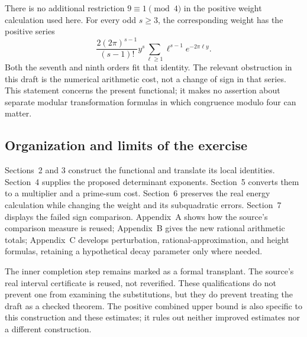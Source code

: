 There is no additional restriction $9\equiv1\pmod4$ in the positive
weight calculation used here. For every odd $s\geq3$, the corresponding
weight has the positive series
\[
 \frac{2(2\pi)^{s-1}}{(s-1)!}y^s
       \sum_{\ell\geq1}\ell^{s-1}e^{-2\pi\ell y}.
\]
Both the seventh and ninth orders fit that identity. The relevant
obstruction in this draft is the numerical arithmetic cost, not a
change of sign in that series. This statement concerns the present
functional; it makes no assertion about separate modular transformation
formulas in which congruence modulo four can matter.

\subsection{Organization and limits of the exercise}

Sections~2 and 3 construct the functional and translate its local
identities. Section~4 supplies the proposed determinant exponents.
Section~5 converts them to a multiplier and a prime-sum cost.
Section~6 preserves the real energy calculation while changing the
weight and its subquadratic errors. Section~7 displays the failed sign
comparison. Appendix~A shows how the source's comparison measure is
reused; Appendix~B gives the new rational arithmetic totals;
Appendix~C develops perturbation, rational-approximation, and height
formulas, retaining a hypothetical decay parameter only where needed.

The inner completion step remains marked as a formal transplant. The
source's real interval certificate is reused, not reverified. These
qualifications do not prevent one from examining the substitutions,
but they do prevent treating the draft as a checked theorem. The
positive combined upper bound is also specific to this construction
and these estimates; it rules out neither improved estimates nor a
different construction.
